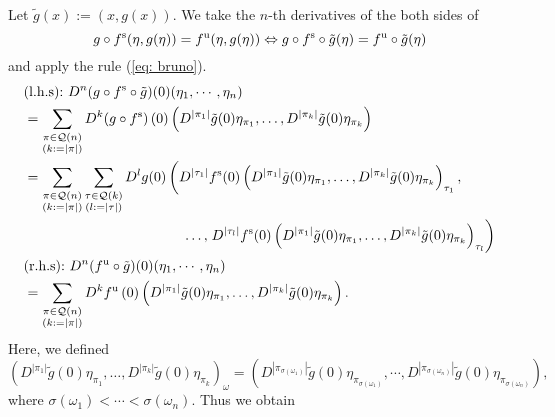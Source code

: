 \documentclass[a4paper,11pt,fleqn]{article}
\begin{document}
Let $\tilde{g}(x):=(x,g(x))$. We take the $n$-th derivatives of the both sides of 
\begin{equation}
    g\circ f^{\rm s}(\eta,g(\eta)) = f^{\rm u}(\eta,g(\eta)) \Leftrightarrow g\circ f^{\rm s} \circ \tilde{g}(\eta) = f^{\rm u} \circ \tilde{g}(\eta)
\end{equation}
and apply the rule (\ref{eq: bruno}). 
\begin{align}
    &\text{(l.h.s):} \ D^n (g\circ f^{\rm s} \circ \tilde{g})(0)(\eta_1,\cdots,\eta_n) \nonumber \\
    & = \sum_{\substack{\pi \in \mathcal{Q}(n) \\
    (k:=|\pi|)}} D^k (g\circ f^{\rm s})\left(0\right)\left(D^{\left|\pi_1\right|} \tilde{g}(0) \eta_{\pi_1}, \ldots, D^{\left|\pi_k\right|} \tilde{g}(0) \eta_{\pi_k}\right) \nonumber \\
    & = \sum_{\substack{\pi \in \mathcal{Q}(n) \\
    (k:=|\pi|)}} \sum_{\substack{\tau \in \mathcal{Q}(k) \\
    (l:=|\tau|)}} D^l g (0) \left(D^{\left|\tau_1\right|} f^{\rm s}(0) \left(D^{\left|\pi_1\right|} \tilde{g}(0) \eta_{\pi_1}, \ldots, D^{\left|\pi_k\right|} \tilde{g}(0) \eta_{\pi_k}\right)_{\tau_1}
    , \right. \nonumber \\ 
    &\hspace{4cm} \ldots, \left. D^{\left|\tau_l\right|} f^{\rm s}(0) \left(D^{\left|\pi_1\right|} \tilde{g}(0) \eta_{\pi_1}, \ldots, D^{\left|\pi_k\right|} \tilde{g}(0) \eta_{\pi_k}\right)_{\tau_l}\right) \\
    &\text{(r.h.s):} \ D^n (f^{\rm u} \circ \tilde{g})(0)(\eta_1,\cdots,\eta_n) \nonumber \\
    &= \sum_{\substack{\pi \in \mathcal{Q}(n) \\
    (k:=|\pi|)}} D^k f^{\rm u}\left(0\right)\left(D^{\left|\pi_1\right|} \tilde{g}(0) \eta_{\pi_1}, \ldots, D^{\left|\pi_k\right|} \tilde{g}(0) \eta_{\pi_k}\right). 
\end{align}
Here, we defined  
\begin{equation}
    \left(D^{\left|\pi_1\right|} \tilde{g}(0) \eta_{\pi_1}, \ldots, D^{\left|\pi_k\right|} \tilde{g}(0) \eta_{\pi_k}\right)_{\omega} =
     \left( D^{\left|\pi_{\sigma(\omega_1)}\right|} \tilde{g}(0) \eta_{\pi_{\sigma(\omega_1)}},\cdots, D^{\left|\pi_{\sigma(\omega_n)}\right|} \tilde{g}(0) \eta_{\pi_{\sigma(\omega_n)}} \right),
\end{equation}
where $\sigma(\omega_1)< \cdots < \sigma(\omega_n)$. 
Thus we obtain 
\end{document}
